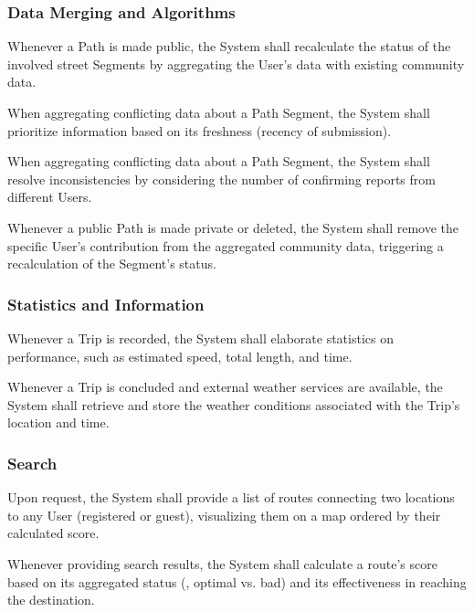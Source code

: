 \subsubsection*{Data Merging and Algorithms}
\begin{rlist}[resume]
    \item Whenever a Path is made public, the System shall recalculate the status of the involved street Segments by aggregating the User's data with existing community data.
    \item When aggregating conflicting data about a Path Segment, the System shall prioritize information based on its freshness (recency of submission).
    \item When aggregating conflicting data about a Path Segment, the System shall resolve inconsistencies by considering the number of confirming reports from different Users.
    \item Whenever a public Path is made private or deleted, the System shall remove the specific User's contribution from the aggregated community data, triggering a recalculation of the Segment's status.
\end{rlist}

\subsubsection*{Statistics and Information}
\begin{rlist}[resume]
    \item Whenever a Trip is recorded, the System shall elaborate statistics on performance, such as estimated speed, total length, and time.
    \item Whenever a Trip is concluded and external weather services are available, the System shall retrieve and store the weather conditions associated with the Trip's location and time.
\end{rlist}

\subsubsection*{Search}
\begin{rlist}[resume]
    \item Upon request, the System shall provide a list of routes connecting two locations to any User (registered or guest), visualizing them on a map ordered by their calculated score.
    \item Whenever providing search results, the System shall calculate a route's score based on its aggregated status (\eg, optimal vs. bad) and its effectiveness in reaching the destination.
\end{rlist}

